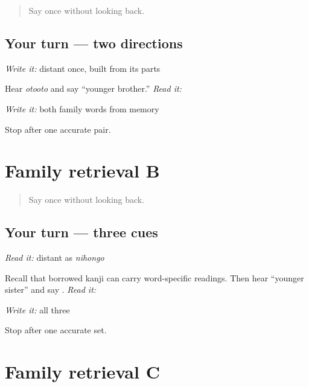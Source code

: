 \label{lesson:JA-R13-family-a}



\begin{quote}
Say \textbf{} once without looking back.
\end{quote}

\subsection*{Your turn — two directions}
\emph{Write it:} distant \textbf{} once, built from its parts

Hear \emph{otooto} and say “younger brother.” \emph{Read it:} \textbf{}

\emph{Write it:} both family words from memory

\begin{tcolorbox}[breakable,colback=teal!4,colframe=teal!35!black,title={Before you move on}]
Stop after one accurate pair.
\end{tcolorbox}
\section[Practice]{Family retrieval B}

\label{lesson:JA-R13-family-b}



\begin{quote}
Say \textbf{} once without looking back.
\end{quote}

\subsection*{Your turn — three cues}
\emph{Read it:} distant \textbf{} as \emph{nihongo}

Recall that borrowed kanji can carry word-specific readings. Then hear “younger sister” and say \textbf{}. \emph{Read it:} \textbf{}

\emph{Write it:} all three

\begin{tcolorbox}[breakable,colback=teal!4,colframe=teal!35!black,title={Before you move on}]
Stop after one accurate set.
\end{tcolorbox}
\section[Practice]{Family retrieval C}

